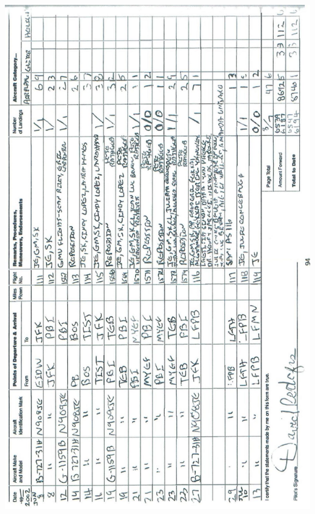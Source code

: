 \documentclass[10pt]{article}
\begin{document}
\includegraphics[max width=\textwidth, center]{2025_02_27_dd68c3d38de88f0516d9g-098}\\
\end{document}
